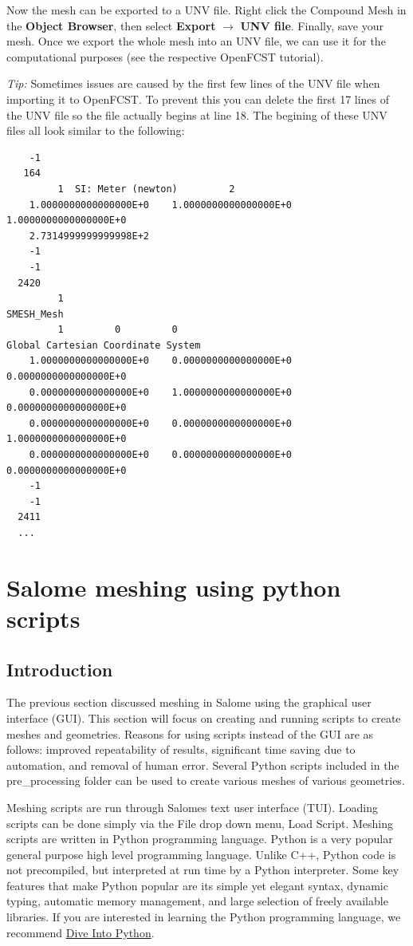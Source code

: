 Now the mesh can be exported to a UNV file. Right click the Compound Mesh in the \textbf{Object Browser}, then select \textbf{Export} $\rightarrow$ \textbf{UNV file}. Finally, save your mesh. Once we export the whole mesh into an UNV file, we can use it for the computational purposes (see the respective OpenFCST tutorial).

\textit{Tip:} Sometimes issues are caused by the first few lines of the UNV file when importing it to OpenFCST. To prevent this you can delete the first 17 lines of the UNV file so the file actually begins at line 18. The begining of these UNV files all look similar to the following:

\begin{lstlisting}
    -1
   164
         1  SI: Meter (newton)         2
    1.0000000000000000E+0    1.0000000000000000E+0    1.0000000000000000E+0
    2.7314999999999998E+2
    -1
    -1
  2420
         1
SMESH_Mesh
         1         0         0
Global Cartesian Coordinate System
    1.0000000000000000E+0    0.0000000000000000E+0    0.0000000000000000E+0
    0.0000000000000000E+0    1.0000000000000000E+0    0.0000000000000000E+0
    0.0000000000000000E+0    0.0000000000000000E+0    1.0000000000000000E+0
    0.0000000000000000E+0    0.0000000000000000E+0    0.0000000000000000E+0
    -1
    -1
  2411
  ...
\end{lstlisting}
  
\section{Salome meshing using python scripts}

\subsection{Introduction}

The previous section discussed meshing in Salome using the graphical user interface (GUI). This section will focus on creating and running scripts to create meshes and geometries. Reasons for using scripts 
instead of the GUI are as follows: improved repeatability of results, significant time saving due to automation, and removal of human error. Several Python scripts included in the pre\_processing
folder can be used to create various meshes of various geometries.

Meshing scripts are run through Salomes text user interface (TUI). Loading scripts can be done simply via the File drop down menu, Load Script. Meshing scripts are written in Python programming language.
Python is a very popular general purpose high level programming language. Unlike C++, Python code is not precompiled, but interpreted at run time by a Python interpreter. Some key features
that make Python popular are its simple yet elegant syntax, dynamic typing, automatic memory management, and large selection of freely available libraries. If you are interested in
learning the Python programming language, we recommend \href{http://www.diveintopython.net/}{Dive Into Python}.

